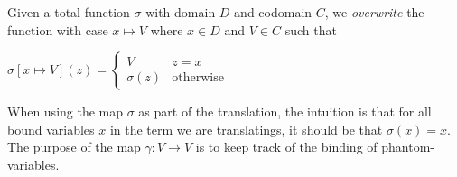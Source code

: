 \documentclass[a4paper,UKenglish,cleveref, autoref]{lipics-v2019}
\newtheorem{notation}[definition]{Notation}
\newcommand{\set}[1]{ \{ #1 \} }
\begin{document}
\begin{definition}
Given a total function $\sigma$ with domain $D$ and codomain $C$, we \emph{overwrite} the function with case $x \mapsto V$ where $x \in D$ and $V \in C$ such that

$\sigma [ x \mapsto V ] (z) = \begin{cases} V & z = x \\ \sigma(z) & \text{otherwise}  \end{cases}$
\end{definition}

%
%

When using the map $\sigma$ as part of the translation, the intuition is that for all bound variables $x$ in the term we are translatings, it should be that $\sigma(x) = x$. The purpose of the map $\gamma : V \rightarrow V$ is to keep track of the binding of phantom-variables.
\end{document}
